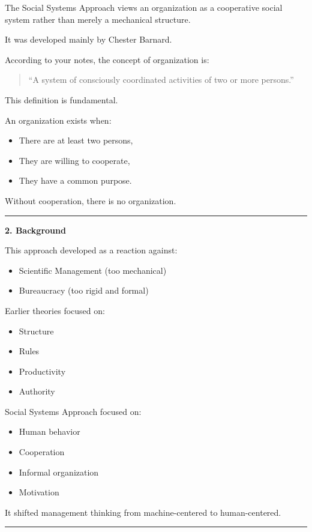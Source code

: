\documentclass[10pt,a4paper]{article}
\newcommand{\separator}{\vspace{0.4em}\noindent\rule{\linewidth}{0.6pt}\vspace{0.4em}}
\begin{document}
The Social Systems Approach views an organization as a cooperative social system rather
than merely a mechanical structure.

It was developed mainly by Chester Barnard.

According to your notes, the concept of organization is:

\begin{quote}
``A system of consciously coordinated activities of two or more persons.''
\end{quote}

This definition is fundamental.

An organization exists when:
\begin{itemize}
  \item There are at least two persons,
  \item They are willing to cooperate,
  \item They have a common purpose.
\end{itemize}

Without cooperation, there is no organization.

\separator

\textbf{2. Background}

This approach developed as a reaction against:
\begin{itemize}
  \item Scientific Management (too mechanical)
  \item Bureaucracy (too rigid and formal)
\end{itemize}

Earlier theories focused on:
\begin{itemize}
  \item Structure
  \item Rules
  \item Productivity
  \item Authority
\end{itemize}

Social Systems Approach focused on:
\begin{itemize}
  \item Human behavior
  \item Cooperation
  \item Informal organization
  \item Motivation
\end{itemize}

It shifted management thinking from machine-centered to human-centered.

\separator
\end{document}
